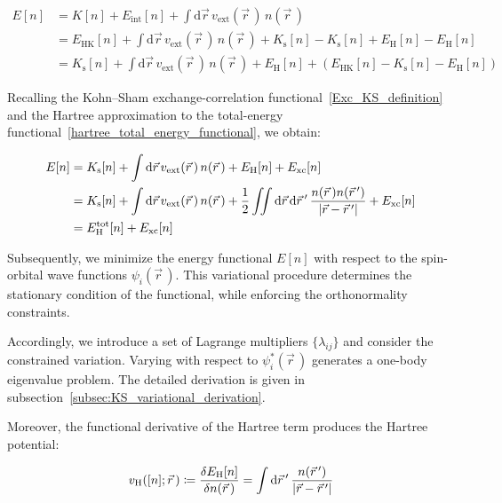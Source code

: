 \begin{equation}
\begin{aligned}
    E[n] &= K[n]+E_\mathrm{int}[n]
    +\int\mathrm{d}\vec{r}\,v_\mathrm{ext}(\vec{r}\,)\,n(\vec{r}\,) \\
    &= E_\mathrm{HK}[n]
    + \int\mathrm{d}\vec{r}\,v_\mathrm{ext}(\vec{r}\,)\,n(\vec{r}\,)
    + K_\mathrm{s}[n] - K_\mathrm{s}[n] + E_\mathrm{H}[n] - E_\mathrm{H}[n] \\
    &= K_\mathrm{s}[n] +
    \int\mathrm{d}\vec{r}\,v_\mathrm{ext}(\vec{r}\,)\,n(\vec{r}\,)
    + E_\mathrm{H}[n] + (E_\mathrm{HK}[n]-K_\mathrm{s}[n]-E_\mathrm{H}[n])
\end{aligned}
\label{energy_density_functional_manipulations}
\end{equation}

Recalling the Kohn--Sham exchange-correlation functional~\eqref{Exc_KS_definition}
and the Hartree approximation to the total-energy functional~\eqref{hartree_total_energy_functional},
we obtain:

\begin{equation}
\begin{aligned}
    E[n] &= K_\mathrm{s}[n]
    + \int\mathrm{d}\vec{r}\,v_\mathrm{ext}(\vec{r}\,)\,n(\vec{r}\,)
    + E_\mathrm{H}[n] + E_\mathrm{xc}[n] \\
    &= K_\mathrm{s}[n]
    + \int\mathrm{d}\vec{r}\,v_\mathrm{ext}(\vec{r}\,)\,n(\vec{r}\,)
    + \frac{1}{2}\iint\mathrm{d}{\vec{r}}\,\mathrm{d}{\vec{r}\,'}\,\frac{n(\vec{r}\,)n(\vec{r}\,')}{|\vec{r}-\vec{r}\,'|}
    + E_\mathrm{xc}[n] \\
    &= E_\mathrm{H}^\mathrm{tot}[n] + E_\mathrm{xc}[n]
\end{aligned}
\end{equation}

Subsequently, we minimize the energy functional $E[n]$ with respect to the spin-orbital wave functions $\psi_i(\vec{r}\,)$.
This variational procedure determines the stationary condition of the functional, while enforcing the orthonormality constraints.

Accordingly, we introduce a set of Lagrange multipliers $\{\lambda_{ij}\}$ and consider the constrained variation.
Varying with respect to $\psi_i^\ast(\vec{r}\,)$ generates a one-body eigenvalue problem.
The detailed derivation is given in subsection~\ref{subsec:KS_variational_derivation}.

Moreover, the functional derivative of the Hartree term produces the Hartree potential:

\begin{equation}
    v_\mathrm{H}([n];\vec{r}\,)
    \coloneqq \frac{\delta E_\mathrm{H}[n]}{\delta n(\vec{r}\,)}
    = \int\mathrm{d}{\vec{r}\,'}\,\frac{n(\vec{r}\,')}{|\vec{r}-\vec{r}\,'|}
\label{Hartree_potential_KS_definition}
\end{equation}

